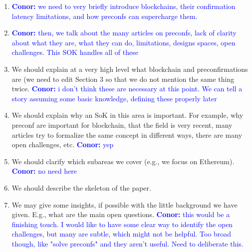 \documentclass[a4paper]{article}
\theoremstyle{boldstyle}
\newcommand{\cm}[1]{\textcolor{blue}{\textbf{Conor:} #1}}
\begin{document}
\begin{enumerate}
    \item \cm{we need to very briefly introduce blockchains, their confirmation latency limitations, and how preconfs can supercharge them. }
    \item \cm{then, we talk about the many articles on preconfs, lack of clarity about what they are, what they can do, limitations, designs spaces, open challenges. This SOK handles all of these}
    \item We should explain at a very high level what blockchain and preconfirmations are (we need to edit Section 3 so that we do not mention the same thing twice. \cm{i don't think these are necessary at this point. We can tell a story assuming some basic knowledge, defining these properly later}
    \item We should explain why an SoK in this area is important. For example, why preconf are important for blockchain, that the field is very recent, many articles try to formalize the same concept in different ways, there are many open challenges, etc.  \cm{yep}
    \item We should clarify which subareas we cover (e.g., we focus on Ethereum). \cm{no need here}
    \item We should describe the skeleton of the paper.
    \item We may give some insights, if possible with the little background we have given. E.g., what are the main open questions. \cm{this would be a finishing touch. I would like to have some clear way to identify the open challenges, but many are subtle, which might not be helpful. Too broad though, like "solve preconfs" and they aren't useful. Need to deliberate this. }
\end{enumerate}
\fi
\end{document}
